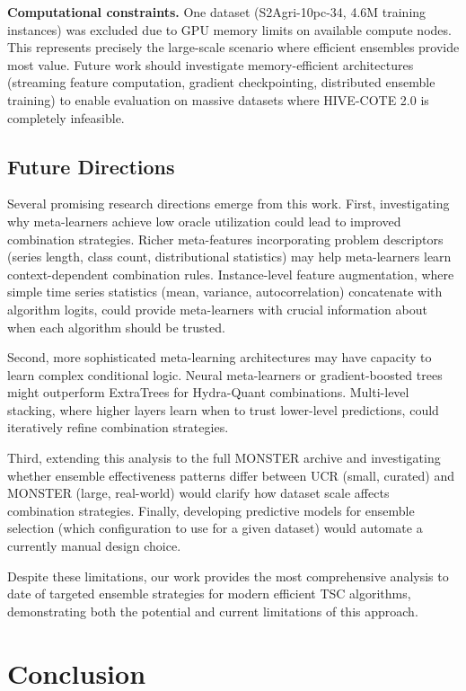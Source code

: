 \documentclass[pdflatex,sn-basic]{sn-jnl}           %
\theoremstyle{thmstyleone}%
\theoremstyle{thmstyletwo}%
\theoremstyle{thmstylethree}%
\begin{document}
\textbf{Computational constraints.} One dataset (S2Agri-10pc-34, 4.6M training instances) was excluded due to GPU memory limits on available compute nodes. This represents precisely the large-scale scenario where efficient ensembles provide most value. Future work should investigate memory-efficient architectures (streaming feature computation, gradient checkpointing, distributed ensemble training) to enable evaluation on massive datasets where HIVE-COTE 2.0 is completely infeasible.

\subsection{Future Directions}

Several promising research directions emerge from this work. First, investigating why meta-learners achieve low oracle utilization could lead to improved combination strategies. Richer meta-features incorporating problem descriptors (series length, class count, distributional statistics) may help meta-learners learn context-dependent combination rules. Instance-level feature augmentation, where simple time series statistics (mean, variance, autocorrelation) concatenate with algorithm logits, could provide meta-learners with crucial information about when each algorithm should be trusted.

Second, more sophisticated meta-learning architectures may have capacity to learn complex conditional logic. Neural meta-learners or gradient-boosted trees might outperform ExtraTrees for Hydra-Quant combinations. Multi-level stacking, where higher layers learn when to trust lower-level predictions, could iteratively refine combination strategies.

Third, extending this analysis to the full MONSTER archive and investigating whether ensemble effectiveness patterns differ between UCR (small, curated) and MONSTER (large, real-world) would clarify how dataset scale affects combination strategies. Finally, developing predictive models for ensemble selection (which configuration to use for a given dataset) would automate a currently manual design choice.

Despite these limitations, our work provides the most comprehensive analysis to date of targeted ensemble strategies for modern efficient TSC algorithms, demonstrating both the potential and current limitations of this approach.


\section{Conclusion}\label{sec13}
\end{document}
